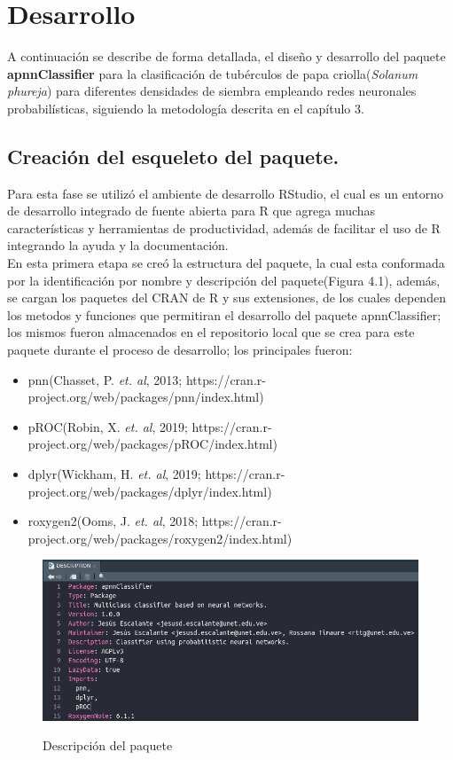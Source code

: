 \chapter{Desarrollo}

	A continuaci\'on se describe de forma detallada, el diseño y desarrollo del paquete \textbf{apnnClassifier} para la clasificaci\'on de tub\'erculos de papa criolla(\textit{Solanum phureja}) para diferentes densidades de siembra empleando redes neuronales probabil\'isticas, siguiendo la metodolog\'ia descrita en el cap\'itulo 3.
	
\section{Creación del esqueleto del paquete.}
	
	Para esta fase se utilizó el ambiente de desarrollo RStudio, el cual es un entorno de desarrollo integrado de fuente abierta para R que agrega muchas caracter\'isticas y herramientas de productividad, además de facilitar el uso de R integrando la ayuda y la documentación.\\
En esta primera etapa se creó la estructura del paquete, la cual esta conformada por la identificación por nombre y descripción del paquete(Figura 4.1), además, se cargan los paquetes del CRAN de R y sus extensiones, de los cuales dependen los metodos y funciones que permitiran el desarrollo del paquete apnnClassifier; los mismos fueron almacenados en el repositorio local que se crea para este paquete durante el proceso de desarrollo; los principales fueron:\\

\begin{itemize}
\item pnn(Chasset, P. \textit{et. al}, 2013; https://cran.r-project.org/web/packages/pnn/index.html)
\item pROC(Robin, X. \textit{et. al}, 2019; https://cran.r-project.org/web/packages/pROC/index.html)
\item dplyr(Wickham, H. \textit{et. al}, 2019; https://cran.r-project.org/web/packages/dplyr/index.html)
\item roxygen2(Ooms, J. \textit{et. al}, 2018; https://cran.r-project.org/web/packages/roxygen2/index.html)
\end{itemize}

\begin{figure}[h]
	\caption{Descripción del paquete}
	\centering
	\includegraphics[scale=0.5]{package-description.png}
	\label{fig:arch}
\end{figure}

